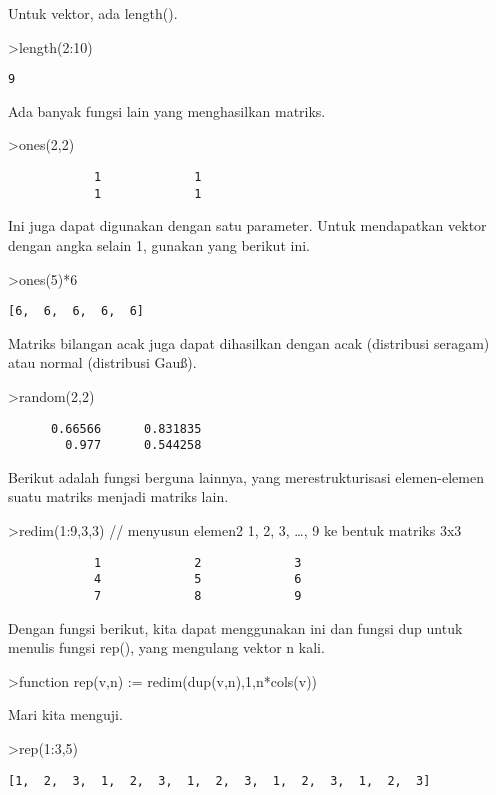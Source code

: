 \documentclass[
]{book}
\begin{document}
Untuk vektor, ada length().

\textgreater length(2:10)

\begin{verbatim}
9
\end{verbatim}

Ada banyak fungsi lain yang menghasilkan matriks.

\textgreater ones(2,2)

\begin{verbatim}
            1             1 
            1             1 
\end{verbatim}

Ini juga dapat digunakan dengan satu parameter. Untuk mendapatkan vektor dengan angka selain 1, gunakan yang berikut ini.

\textgreater ones(5)*6

\begin{verbatim}
[6,  6,  6,  6,  6]
\end{verbatim}

Matriks bilangan acak juga dapat dihasilkan dengan acak (distribusi seragam) atau normal (distribusi Gauß).

\textgreater random(2,2)

\begin{verbatim}
      0.66566      0.831835 
        0.977      0.544258 
\end{verbatim}

Berikut adalah fungsi berguna lainnya, yang merestrukturisasi elemen-elemen suatu matriks menjadi matriks lain.

\textgreater redim(1:9,3,3) // menyusun elemen2 1, 2, 3, \ldots, 9 ke bentuk matriks 3x3

\begin{verbatim}
            1             2             3 
            4             5             6 
            7             8             9 
\end{verbatim}

Dengan fungsi berikut, kita dapat menggunakan ini dan fungsi dup untuk menulis fungsi rep(), yang mengulang vektor n kali.

\textgreater function rep(v,n) := redim(dup(v,n),1,n*cols(v))

Mari kita menguji.

\textgreater rep(1:3,5)

\begin{verbatim}
[1,  2,  3,  1,  2,  3,  1,  2,  3,  1,  2,  3,  1,  2,  3]
\end{verbatim}
\end{document}
